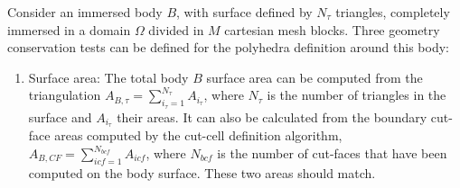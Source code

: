 \documentclass[11pt]{book}
\begin{document}
Consider an immersed body $B$, with surface defined by $N_\tau$ triangles, completely immersed in a domain $\Omega$ divided in $M$ cartesian mesh blocks.
Three geometry conservation tests can be defined for the polyhedra definition around this body:
%
\begin{enumerate}

    \item Surface area:
    The total body $B$ surface area can be computed from the triangulation $A_{B,\tau}=\sum_{i_\tau=1}^{N_\tau}{A_{i_\tau}}$, where $N_\tau$ is the number of triangles in the surface and $A_{i_\tau}$ their areas. It can also be calculated from the boundary cut-face areas computed by the cut-cell definition algorithm,  $A_{B,CF}=\sum_{icf=1}^{N_{bcf}}{A_{icf}}$, where $N_{bcf}$ is the number of cut-faces that have been computed on the body surface. These two areas should match.
    \newline


\end{enumerate}
\end{document}
